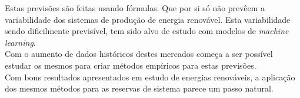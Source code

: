 Estas previsões são feitas usando fórmulas. Que por si só não prevêem a variabilidade dos sistemas de produção de energia renovável. Esta variabilidade sendo dificilmente previsível, tem sido alvo de estudo com modelos de \textit{machine learning}.\\
Com o aumento de dados históricos destes mercados começa a ser possível estudar os mesmos para criar métodos empíricos para estas previsões.\\
Com bons resultados apresentados em estudo de energias renováveis, a aplicação dos mesmos métodos para as reservas de sistema parece um passo natural. \\





\thispagestyle{plain}
